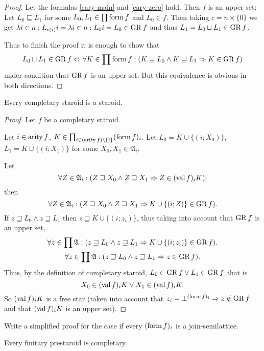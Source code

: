 \begin{proof}
Let the formulas \ref{cary-main} and \ref{cary-zero} hold. Then
$f$ is an upper set: Let $L_{0}\sqsubseteq L_{1}$ for some $L_{0},L_{1}\in\prod\operatorname{form} f$
and $L_{0}\in f$. Then taking $c=n\times\{0\}$ we get $\lambda i\in n:L_{c(i)}i=\lambda i\in n:L_{0}i=L_{0}\in\operatorname{GR} f$
and thus $L_{1}=L_{0}\sqcup L_{1}\in\operatorname{GR} f$.

Thus to finish the proof it is enough to show that 
\[
L_{0}\sqcup L_{1}\in\operatorname{GR} f\Leftrightarrow\forall K\in\prod\operatorname{form} f:(K\sqsupseteq L_{0}\wedge K\sqsupseteq L_{1}\Rightarrow K\in\operatorname{GR} f)
\]
under condition that $\operatorname{GR} f$ is an upper set. But this equivalence is obvious in both directions.\end{proof}
\begin{prop}
Every completary staroid is a staroid.\end{prop}
\begin{proof}
Let $f$ be a completary staroid.

Let $i\in\operatorname{arity} f$, $K\in\prod_{i\in(\operatorname{arity} f)\setminus\{i\}}(\operatorname{form} f)_{i}$.
Let $L_{0}=K\cup\{(i;X_{0})\}$, $L_{1}=K\cup\{(i;X_{1})\}$ for some
$X_{0},X_{1}\in\mathfrak{A}_{i}$.

Let 
\[
\forall Z\in\mathfrak{A}_{i}:(Z\sqsupseteq X_{0}\wedge Z\sqsupseteq X_{1}\Rightarrow Z\in(\operatorname{val} f)_{i}K);
\]
then 
\[
\forall Z\in\mathfrak{A}_{i}:(Z\sqsupseteq X_{0}\wedge Z\sqsupseteq X_{1}\Rightarrow K\cup\{(i;Z)\}\in\operatorname{GR} f).
\]
If $z\sqsupseteq L_{0}\wedge z\sqsupseteq L_{1}$ then $z\sqsupseteq K\cup\{(i;z_{i})\}$,
thus taking into account that $\operatorname{GR} f$ is an upper set,
\begin{gather*}
\forall z\in\prod\mathfrak{A}:(z\sqsupseteq L_{0}\wedge z\sqsupseteq L_{1}\Rightarrow K\cup\{(i;z_{i})\}\in\operatorname{GR} f).\\
\forall z\in\prod\mathfrak{A}:(z\sqsupseteq L_{0}\wedge z\sqsupseteq L_{1}\Rightarrow z\in\operatorname{GR} f).
\end{gather*}
Thus, by the definition of completary staroid, $L_{0}\in\operatorname{GR} f\vee L_{1}\in\operatorname{GR} f$
that is 
\[
X_{0}\in(\operatorname{val} f)_{i}K\vee X_{1}\in(\operatorname{val} f)_{i}K.
\]
So $(\operatorname{val} f)_{i}K$ is a free star (taken into account that $z_{i}=\bot^{(\operatorname{form} f)_{i}}\Rightarrow z\notin\operatorname{GR} f$
and that $(\operatorname{val} f)_{i}K$ is an upper set).\end{proof}
\begin{xca}
Write a simplified proof for the case if every $(\operatorname{form} f)_{i}$ is
a join-semilattice.\end{xca}
\begin{lem}
Every finitary prestaroid is completary.\end{lem}
